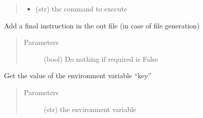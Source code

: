 \documentclass[a4paper,10pt,english]{sphinxmanual}
\begin{document}
\begin{fulllineitems}
\begin{fulllineitems}
\begin{quote}
\begin{description}
\begin{itemize}
\item {} 
 \textendash{} (str) the command to execute

\end{itemize}

\end{description}\end{quote}

\end{fulllineitems}


\begin{fulllineitems}
\label{\detokenize{apidoc_src/src:src.fileEnviron.ContextFileEnviron.finish}}
Add a final instruction in the out file (in case of file generation)
\begin{quote}\begin{description}
\item[{Parameters}] \leavevmode
{} \textendash{} (bool) Do nothing if required is False

\end{description}\end{quote}

\end{fulllineitems}


\begin{fulllineitems}
\label{\detokenize{apidoc_src/src:src.fileEnviron.ContextFileEnviron.get}}
Get the value of the environment variable “key”
\begin{quote}\begin{description}
\item[{Parameters}] \leavevmode
{} \textendash{} (str) the environment variable

\end{description}\end{quote}

\end{fulllineitems}



\end{fulllineitems}
\end{document}
